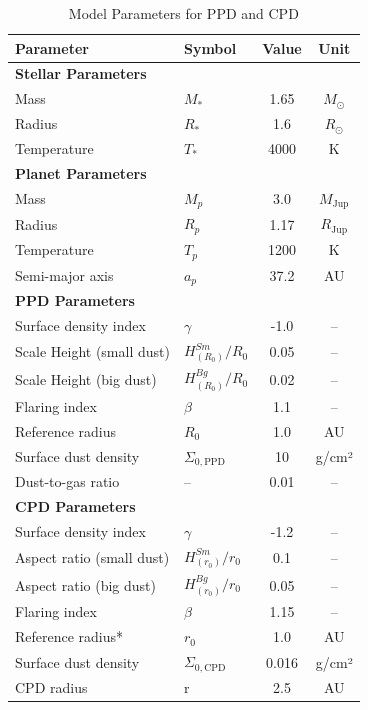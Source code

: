 


\clearpage

\begin{table}[h]
\centering
\caption{Model Parameters for PPD and CPD}
\label{tab:parameters}
\begin{tabular}{l l c c}
\toprule
\textbf{Parameter} & \textbf{Symbol} & \textbf{Value} & \textbf{Unit} \\
\midrule
\textbf{Stellar Parameters} & & & \\
Mass & \(M_*\) & 1.65 & \(M_\odot\) \\
Radius & \(R_*\) & 1.6 & \(R_\odot\) \\
Temperature & \(T_*\) & 4000 & K \\
\midrule
\textbf{Planet Parameters} & & & \\
Mass & \(M_p\) & 3.0 & \(M_{\text{Jup}}\) \\
Radius & \(R_p\) & 1.17 & \(R_{\text{Jup}}\) \\
Temperature & \(T_p\) & 1200 & K \\
Semi-major axis & \(a_p\) & 37.2 & AU \\
\midrule
\textbf{PPD Parameters} & & & \\
Surface density index & \(\gamma\) & -1.0 & -- \\
Scale Height (small dust) & \(H^{Sm}_{(R_{0})}/R_0\) & 0.05 & -- \\
Scale Height (big dust) & \(H^{Bg}_{(R_{0})}/R_0\) & 0.02 & -- \\
Flaring index & \(\beta\) & 1.1 & -- \\
Reference radius & \(R_0\) & 1.0 & AU \\
Surface dust density & \(\Sigma_{0,\text{PPD}}\) & 10 & g/cm² \\
Dust-to-gas ratio & -- & 0.01 & -- \\
\midrule
\textbf{CPD Parameters} & & & \\
Surface density index & \(\gamma\) & -1.2 & -- \\
Aspect ratio (small dust) & \(H^{Sm}_{(r_{0})}/r_0\) & 0.1 & -- \\
Aspect ratio (big dust) & \(H^{Bg}_{(r_{0})}/r_0\) & 0.05 & -- \\
Flaring index & \(\beta\) & 1.15 & -- \\
Reference radius* & \(r_0\) & 1.0 & AU \\
Surface dust density & \(\Sigma_{0,\text{CPD}}\) & 0.016 & g/cm² \\
CPD radius & r & 2.5 & AU \\

\end{tabular}
\end{table}
